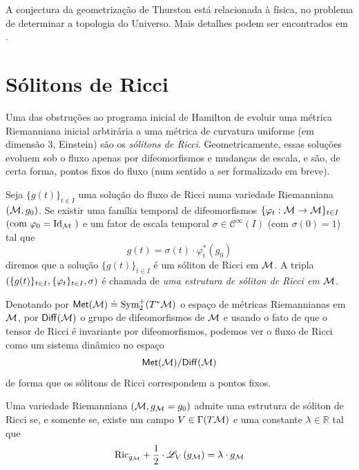         \begin{oobs}
        A conjectura da geometrização de Thurston está relacionada à física, no problema de determinar a topologia do Universo. Mais detalhes podem ser encontrados em .
        \end{oobs}



  \section{Sólitons de Ricci}
  Uma das obstruções ao programa inicial de Hamilton de evoluir uma métrica Riemanniana inicial arbtirária a uma métrica de curvatura uniforme (em dimensão $3$, Einstein) são os \emph{sólitons de Ricci}. Geometricamente, essas soluções evoluem sob o fluxo apenas por difeomorfismos e mudanças de escala, e são, de certa forma, pontos fixos do fluxo (num sentido a ser formalizado em breve).
  
  \begin{deff}\label{defSoliton}
  Seja $\{g(t)\}_{t \in I}$ uma solução do fluxo de Ricci numa variedade Riemanniana $(\mathcal{M}, g_0)$. Se existir uma família temporal de difeomorfismos $\{ \varphi_t : \mathcal{M} \to \mathcal{M}\}_{t \in I}$ $\left(\text{com $\varphi_0 = \operatorname{Id}_{\mathcal{M}}$ }\right)$ e um fator de escala temporal $\sigma \in \mathscr{C}^{\infty}(I)$ (com $\sigma(0) = 1$) tal que
  \begin{equation}\label{RicSoliton}
  g(t) = \sigma(t) \cdot \varphi_t^{*}(g_0)
  \end{equation}
  diremos que a solução $\{g(t) \}_{t \in I}$ é um sóliton de Ricci em $\mathcal{M}$. A tripla $\left(\{g(t) \}_{t \in I}, \{\varphi_t \}_{t \in I}, \sigma \right)$ é chamada de \emph{uma estrutura de sóliton de Ricci em $\mathcal{M}$.}
  \end{deff}
  
  \begin{oobs}
  Denotando por ${\sf Met}(\mathcal{M}) \doteq \operatorname{Sym}_2^{+}(T^{*}\mathcal{M})$ o espaço de métricas Riemannianas em $\mathcal{M}$, por ${\sf Diff}(\mathcal{M})$ o grupo de difeomorfismos de $\mathcal{M}$ e usando o fato de que o tensor de Ricci é invariante por difeomorfismos, podemos ver o fluxo de Ricci como um sistema dinâmico no espaço 
  \[
  {\sf Met}(\mathcal{M}) / {\sf Diff}(\mathcal{M})
  \] de forma que os sólitons de Ricci correspondem a pontos fixos.
  \end{oobs}


  \begin{proposicao}\label{PropEstrutura}
    Uma variedade Riemanniana $(\mathcal{M}, g_{\mathcal{M}} = g_0)$ admite uma estrutura de sóliton de Ricci se, e somente se, existe um campo $V \in \Gamma(T \mathcal{M})$ e uma constante $\lambda \in \mathbb{R}$ tal que
    \begin{equation}\label{EqVSoliton}
    \mathrm{Ric}_{g_{\mathcal{M}}} + \frac{1}{2} \cdot \mathscr{L}_{V} \left( g_{\mathcal{M}} \right) = \lambda \cdot g_{\mathcal{M}} 
    \end{equation}
  \end{proposicao}

